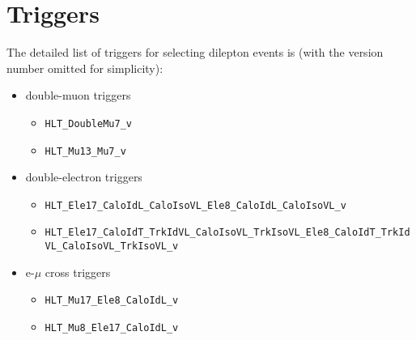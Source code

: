 \section{Triggers}
\label{app:trigsel}

The detailed list of triggers for selecting dilepton events is (with the version number omitted for simplicity):


\begin{itemize}
\item double-muon triggers
  \begin{itemize}
  \item \verb=HLT_DoubleMu7_v=
  \item \verb=HLT_Mu13_Mu7_v=
  \end{itemize}
\item double-electron triggers
  \begin{itemize}
  \item \verb=HLT_Ele17_CaloIdL_CaloIsoVL_Ele8_CaloIdL_CaloIsoVL_v=
  \item \verb=HLT_Ele17_CaloIdT_TrkIdVL_CaloIsoVL_TrkIsoVL_Ele8_CaloIdT_TrkIdVL_CaloIsoVL_TrkIsoVL_v=
  \end{itemize}
\item e-$\mu$ cross triggers
  \begin{itemize}
  \item \verb=HLT_Mu17_Ele8_CaloIdL_v=
  \item \verb=HLT_Mu8_Ele17_CaloIdL_v=
  \end{itemize}
\end{itemize}



